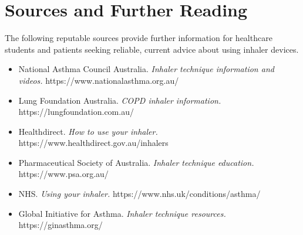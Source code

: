 \section*{Sources and Further Reading}
The following reputable sources provide further information for healthcare students and patients seeking reliable, current advice about using inhaler devices.

\begin{itemize}
    \item National Asthma Council Australia. \textit{Inhaler technique information and videos.} https://www.nationalasthma.org.au/
    \item Lung Foundation Australia. \textit{COPD inhaler information.} https://lungfoundation.com.au/
    \item Healthdirect. \textit{How to use your inhaler.} https://www.healthdirect.gov.au/inhalers
    \item Pharmaceutical Society of Australia. \textit{Inhaler technique education.} https://www.psa.org.au/
    \item NHS. \textit{Using your inhaler.} https://www.nhs.uk/conditions/asthma/
    \item Global Initiative for Asthma. \textit{Inhaler technique resources.} https://ginasthma.org/
\end{itemize}
